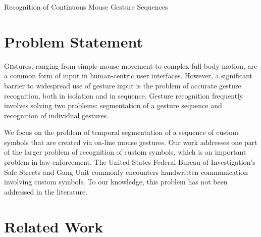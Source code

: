 \documentclass[twoside]{article}
\begin{document}
\centerline{Recognition of Continuous Mouse Gesture Sequences}
\normalsize


\begin{multicols}{2} %

\section{Problem Statement}

\lettrine[nindent=0em,lines=2]{G}estures, ranging from simple mouse movement to
complex full-body motion, are a common form of input in human-centric user
interfaces\cite{mitra_gesture_2007}. However, a significant barrier to
widespread use of gesture input is the problem of accurate gesture recognition,
both in isolation and in sequence. Gesture recognition frequently involves
solving two problems: segmentation of a gesture sequence and recognition of
individual gestures.

We focus on the problem of temporal segmentation of a
sequence of custom symbols that are created via on-line mouse gestures. Our work
addresses one part of the larger problem of recognition of custom symbols, which
is an important problem in law enforcement. The United States Federal Bureau of
Investigation's Safe Streets and Gang Unit commonly encounters handwritten
communication involving custom symbols\cite{lyddane_donald_united_2006}. To our
knowledge, this problem has not been addressed in the literature.

\section{Related Work}


\end{multicols}
\end{document}
